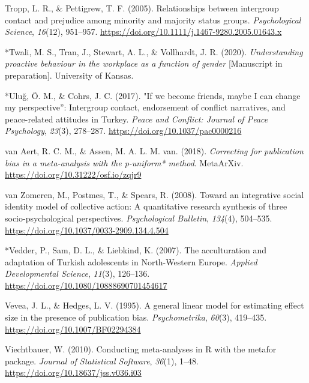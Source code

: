 \documentclass[12pt, letterpaper]{article}
\begin{document}
\leavevmode\hypertarget{ref-tropp_relationships_2005}{}%
Tropp, L. R., \& Pettigrew, T. F. (2005). Relationships between
intergroup contact and prejudice among minority and majority status
groups. \emph{Psychological Science}, \emph{16}(12), 951--957.
\url{https://doi.org/10.1111/j.1467-9280.2005.01643.x}

\leavevmode\hypertarget{ref-2394}{}%
*Twali, M. S., Tran, J., Stewart, A. L., \& Vollhardt, J. R. (2020).
\emph{Understanding proactive behaviour in the workplace as a function
of gender} {[}Manuscript in preparation{]}. University of Kansas.

\leavevmode\hypertarget{ref-286}{}%
*Uluğ, Ö. M., \& Cohrs, J. C. (2017). "If we become friends, maybe I can
change my perspective'': Intergroup contact, endorsement of conflict
narratives, and peace-related attitudes in Turkey. \emph{Peace and
Conflict: Journal of Peace Psychology}, \emph{23}(3), 278--287.
\url{https://doi.org/10.1037/pac0000216}

\leavevmode\hypertarget{ref-van_aert_correcting_2018}{}%
van Aert, R. C. M., \& Assen, M. A. L. M. van. (2018). \emph{Correcting
for publication bias in a meta-analysis with the p-uniform* method}.
MetaArXiv. \url{https://doi.org/10.31222/osf.io/zqjr9}

\leavevmode\hypertarget{ref-van_zomeren_toward_2008}{}%
van Zomeren, M., Postmes, T., \& Spears, R. (2008). Toward an
integrative social identity model of collective action: A quantitative
research synthesis of three socio-psychological perspectives.
\emph{Psychological Bulletin}, \emph{134}(4), 504--535.
\url{https://doi.org/10.1037/0033-2909.134.4.504}

\leavevmode\hypertarget{ref-829}{}%
*Vedder, P., Sam, D. L., \& Liebkind, K. (2007). The acculturation and
adaptation of Turkish adolescents in North-Western Europe. \emph{Applied
Developmental Science}, \emph{11}(3), 126--136.
\url{https://doi.org/10.1080/10888690701454617}

\leavevmode\hypertarget{ref-vevea_general_1995}{}%
Vevea, J. L., \& Hedges, L. V. (1995). A general linear model for
estimating effect size in the presence of publication bias.
\emph{Psychometrika}, \emph{60}(3), 419--435.
\url{https://doi.org/10.1007/BF02294384}

\leavevmode\hypertarget{ref-viechtbauer_conducting_2010}{}%
Viechtbauer, W. (2010). Conducting meta-analyses in R with the metafor
package. \emph{Journal of Statistical Software}, \emph{36}(1), 1--48.
\url{https://doi.org/10.18637/jss.v036.i03}
\end{document}
